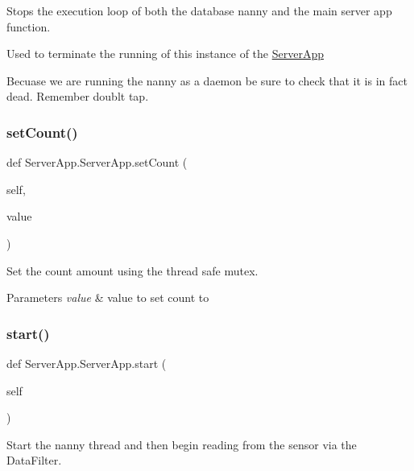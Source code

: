 Stops the execution loop of both the database nanny and the main server app function. 

Used to terminate the running of this instance of the \mbox{\hyperlink{class_server_app_1_1_server_app}{Server\+App}} \begin{DoxyVerb}   Becuase we are running the nanny as a daemon be sure to check that it is in fact dead. Remember doublt tap.\end{DoxyVerb}
 \mbox{\label{class_server_app_1_1_server_app_a665a6527552ef9b8ba12e196b9884655}} 
\subsubsection{\texorpdfstring{set\+Count()}{setCount()}}
{\footnotesize\ttfamily def Server\+App.\+Server\+App.\+set\+Count (\begin{DoxyParamCaption}\item[{}]{self,  }\item[{}]{value }\end{DoxyParamCaption})}



Set the count amount using the thread safe mutex. 


\begin{DoxyParams}{Parameters}
{\em value} & value to set count to \\
\hline
\end{DoxyParams}
\mbox{\label{class_server_app_1_1_server_app_a847d2ab7b7c525f897d710859f363ab5}} 
\subsubsection{\texorpdfstring{start()}{start()}}
{\footnotesize\ttfamily def Server\+App.\+Server\+App.\+start (\begin{DoxyParamCaption}\item[{}]{self }\end{DoxyParamCaption})}



Start the nanny thread and then begin reading from the sensor via the Data\+Filter. 

